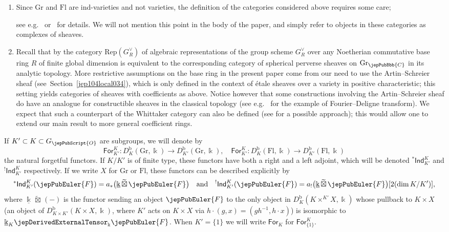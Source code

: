 \begin{rmk}\label{jep104local026}
\begin{enumerate}
\item
Since $\mathrm{Gr}$ and $\mathrm{Fl}$ are ind-varieties and not varieties, the definition of the categories considered above requires some care; 

see e.g.~\cite[\S 2.2]{jep104ref37} or~\cite[App.]{jep104ref27} for details. 
We will not mention this point in the body of the paper, and simply refer to objects in these categories as complexes of sheaves.
\item
Recall that by \cite{jep104ref36} the category $\mathrm{Rep}(G^\vee_R)$ of algebraic representations of the group scheme $G^\vee_R$ over any Noetherian commutative base ring $R$ of finite global dimension is equivalent to the corresponding category of spherical perverse sheaves on $\mathrm{Gr}_{\jepPubBbb{C}}$ in its analytic topology. 
More restrictive assumptions on the base ring in the present paper come from our need to 
use the Artin--Schreier sheaf (see~Section~\ref{jep104local034}), which is only defined in the context of \'etale sheaves over a variety 
in positive characteristic; this setting yields categories of sheaves with coefficients
as above. Notice however that some constructions involving the Artin--Schreier
sheaf do have an analogue for constructible sheaves in the classical topology (see e.g.~\cite{jep104ref44} for the example of Fourier--Deligne transform). We expect that such a
counterpart of the Whittaker category can also be defined (see \cite[Rem. 10.3.6]{jep104ref08}
for a possible approach); this would allow one to extend our main result
to more general coefficient rings.
\end{enumerate}
\end{rmk}

If $K' \subset K \subset G_{\jepPubScript{O}}$ are subgroups, we will denote by
\[
 \mathsf{For}^{K}_{K'} : D^{\mathrm{b}}_K(\mathrm{Gr},\Bbbk) \to D^{\mathrm{b}}_{K'}(\mathrm{Gr},\Bbbk), \quad \mathsf{For}^{K}_{K'} : D^{\mathrm{b}}_K(\mathrm{Fl},\Bbbk) \to D^{\mathrm{b}}_{K'}(\mathrm{Fl},\Bbbk)
\]
the natural forgetful functors. If $K/K'$ is of finite type, these functors have both a right and a left adjoint, which will be denoted ${}^{*}\mathsf{Ind}_{K'}^K$ and ${}^{!}\mathsf{Ind}_{K'}^K$ respectively. If we write $X$ for $\mathrm{Gr}$ or $\mathrm{Fl}$, these functors can be described explicitly by
\[
 {}^{*}\mathsf{Ind}_{K'}^K(\jepPubEuler{F}) = a_* \bigl( \underline{\Bbbk} \, \widetilde{\boxtimes} \, \jepPubEuler{F} \bigr) \quad \text{and} \quad {}^{!}\mathsf{Ind}_{K'}^K(\jepPubEuler{F}) = a_! \bigl( \underline{\Bbbk} \, \widetilde{\boxtimes} \, \jepPubEuler{F} \bigr)[2(\dim K/ K')],
\]
where $\underline{\Bbbk} \, \widetilde{\boxtimes} \,(-)$ is the functor sending an object $\jepPubEuler{F}$ to the only object in $D^{\mathrm{b}}_K(K \times^{K'} X, \Bbbk)$ whose pullback to $K \times X$ (an object of $D^{\mathrm{b}}_{K \times K'}(K \times X,\Bbbk)$, where $K'$ acts on $K \times X$ via $h \cdot (g,x)=(gh^{-1}, h \cdot x)$) is isomorphic to $\underline{\Bbbk}_K \jepDerivedExternalTensor_\Bbbk \jepPubEuler{F}$.
When $K'=\{1\}$ we will write $\mathsf{For}_K$ for $\mathsf{For}^K_{\{1\}}$.

